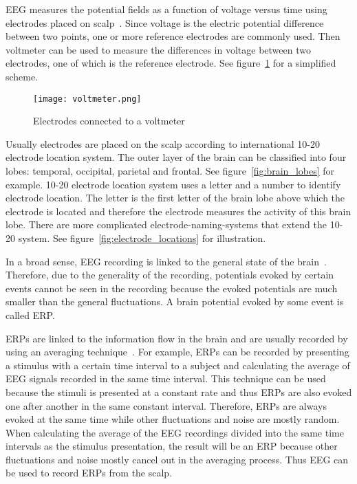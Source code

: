 \gls{EEG} measures the potential fields as a function of voltage versus time using electrodes placed on scalp~\cite{field_count}. Since voltage is the electric potential difference between two points, one or more reference electrodes are commonly used. Then voltmeter can be used to measure the differences in voltage between two electrodes, one of which is the reference electrode. See figure~\ref{fig:voltmeter} for a simplified scheme.

\begin{figure}[h!]
	\centering
	\texttt{[image: voltmeter.png]}
	\caption{Electrodes connected to a voltmeter~\cite[p.~120]{ERP}}
	\label{fig:voltmeter}
\end{figure}

Usually electrodes are placed on the scalp according to international 10-20 electrode location system. The outer layer of the brain can be classified into four lobes: temporal, occipital, parietal and frontal. See figure~\ref{fig:brain_lobes} for example. 10-20 electrode location system uses a letter and a number to identify electrode location. The letter is the first letter of the brain lobe above which the electrode is located and therefore the electrode measures the activity of this brain lobe. There are more complicated electrode-naming-systems that extend the 10-20 system. See figure~\ref{fig:electrode_locations} for illustration.

In a broad sense, \gls{EEG} recording is linked to the general state of the brain~\cite{VEP}. Therefore, due to the generality of the recording, potentials evoked by certain events cannot be seen in the recording because the evoked potentials are much smaller than the general fluctuations. A brain potential evoked by some event is called \gls{ERP}. 

\glspl{ERP} are linked to the information flow in the brain and are usually recorded by using an averaging technique~\cite{ERP}. For example, \glspl{ERP} can be recorded by presenting a stimulus with a certain time interval to a subject and calculating the average of \gls{EEG} signals recorded in the same time interval. This technique can be used because the stimuli is presented at a constant rate and thus \glspl{ERP} are also evoked one after another in the same constant interval. Therefore, \glspl{ERP} are always evoked at the same time while other fluctuations and noise are mostly random. When calculating the average of the \gls{EEG} recordings divided into the same time intervals as the stimulus presentation, the result will be an \gls{ERP} because other fluctuations and noise mostly cancel out in the averaging process. Thus \gls{EEG} can be used to record \glspl{ERP} from the scalp. 

